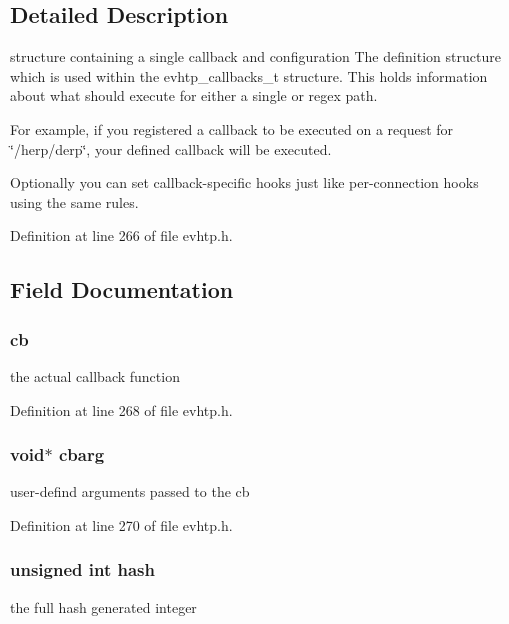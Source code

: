 \subsection{Detailed Description}
structure containing a single callback and configuration The definition structure which is used within the evhtp\_\-callbacks\_\-t structure. This holds information about what should execute for either a single or regex path.

For example, if you registered a callback to be executed on a request for \char`\"{}/herp/derp\char`\"{}, your defined callback will be executed.

Optionally you can set callback-\/specific hooks just like per-\/connection hooks using the same rules. 

Definition at line 266 of file evhtp.h.



\subsection{Field Documentation}
\hypertarget{structevhtp__callback__s_a783ee29046d4ff3e8c75f811e80fd57b}{
\subsubsection[{cb}]{ {\bf cb}}}
\label{structevhtp__callback__s_a783ee29046d4ff3e8c75f811e80fd57b}
the actual callback function 

Definition at line 268 of file evhtp.h.

\hypertarget{structevhtp__callback__s_aafd3d1a6343925cb274875556a6faa0e}{
\subsubsection[{cbarg}]{\setlength{\rightskip}{0pt plus 5cm}void$\ast$ {\bf cbarg}}}
\label{structevhtp__callback__s_aafd3d1a6343925cb274875556a6faa0e}
user-\/defind arguments passed to the cb 

Definition at line 270 of file evhtp.h.

\hypertarget{structevhtp__callback__s_a09f9a9ce240560b1d191b42ed56af642}{
\subsubsection[{hash}]{\setlength{\rightskip}{0pt plus 5cm}unsigned int {\bf hash}}}
\label{structevhtp__callback__s_a09f9a9ce240560b1d191b42ed56af642}
the full hash generated integer 

